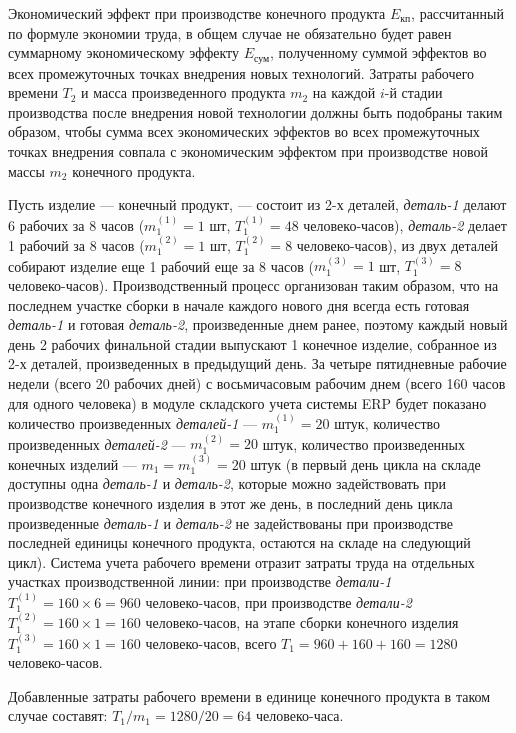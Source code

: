 \documentclass{article}
\let\textitorig\textit
\renewcommand{\textit}[1]{{\fontfamily{cmr}\selectfont \textitorig{#1}}}
\begin{document}
Экономический эффект при производстве конечного продукта $E_{\mbox{кп}}$, рассчитанный по формуле экономии труда, в общем случае не обязательно будет равен суммарному экономическому эффекту $E_{\mbox{сум}}$, полученному суммой эффектов во всех промежуточных точках внедрения новых технологий. Затраты рабочего времени $T_2$ и масса произведенного продукта $m_2$ на каждой $i$-й стадии производства после внедрения новой технологии должны быть подобраны таким образом, чтобы сумма всех экономических эффектов во всех промежуточных точках внедрения совпала с экономическим эффектом при производстве новой массы $m_2$ конечного продукта.

Пусть изделие — конечный продукт, — состоит из 2-х деталей, \textit{деталь-1} делают 6 рабочих за 8 часов ($m_1^{(1)} = 1$ шт, $T_1^{(1)}=48$ человеко-часов), \textit{деталь-2} делает 1 рабочий за 8 часов ($m_1^{(2)} = 1$ шт, $T_1^{(2)}=8$ человеко-часов), из двух деталей собирают изделие еще 1 рабочий еще за 8 часов ($m_1^{(3)} = 1$ шт, $T_1^{(3)}=8$ человеко-часов). Производственный процесс организован таким образом, что на последнем участке сборки в начале каждого нового дня всегда есть готовая \textit{деталь-1} и готовая \textit{деталь-2}, произведенные днем ранее, поэтому каждый новый день 2 рабочих финальной стадии выпускают 1 конечное изделие, собранное из 2-х деталей, произведенных в предыдущий день. За четыре пятидневные рабочие недели (всего 20 рабочих дней) с восьмичасовым рабочим днем (всего 160 часов для одного человека) в модуле складского учета системы ERP будет показано количество произведенных \textit{деталей-1} — $m_1^{(1)} = 20$ штук, количество произведенных \textit{деталей-2} — $m_1^{(2)} = 20$ штук, количество произведенных конечных изделий — $m_1 = m_1^{(3)} = 20$ штук (в первый день цикла на складе доступны одна \textit{деталь-1} и \textit{деталь-2}, которые можно задействовать при производстве конечного изделия в этот же день, в последний день цикла произведенные \textit{деталь-1} и \textit{деталь-2} не задействованы при производстве последней единицы конечного продукта, остаются на складе на следующий цикл). Система учета рабочего времени отразит затраты труда на отдельных участках производственной линии: при производстве \textit{детали-1} $T_1^{(1)} = 160 \times 6 = 960$ человеко-часов, при производстве \textit{детали-2} $T_1^{(2)} = 160 \times 1 = 160$ человеко-часов, на этапе сборки конечного изделия $T_1^{(3)} = 160 \times 1 = 160$ человеко-часов, всего $T_1 = 960 + 160 + 160 = 1280$ человеко-часов.

Добавленные затраты рабочего времени в единице конечного продукта в таком случае составят: $T_1 / m_1 = 1280 / 20 = 64$ человеко-часа.
\end{document}
